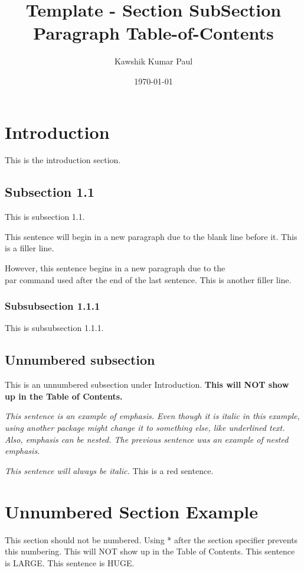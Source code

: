 \documentclass[14pt, a4paper]{article} %
\title{Template - Section SubSection Paragraph Table-of-Contents}
\author{Kawshik Kumar Paul}
\date{\today}
\begin{document}
\maketitle
\tableofcontents %
\pagebreak %

\section{Introduction}
This is the introduction section.

\subsection{Subsection 1.1}
This is subsection 1.1.

This sentence will begin in a new paragraph due to the blank line before it. This is a filler line.\par
However, this sentence begins in a new paragraph due to the \\par command used after the end of the last sentence. This is another filler line.

\subsubsection{Subsubsection 1.1.1}
This is subsubsection 1.1.1.

\subsection*{Unnumbered subsection}
This is an unnumbered subsection under Introduction. \textbf{This will NOT show up in the Table of Contents.} 

\emph{This sentence is an example of emphasis. Even though it is italic in this example, using another package might change it to something else, like underlined text.  \emph{Also, emphasis can be nested.} The previous sentence was an example of nested emphasis.} 

\textit{This sentence will always be italic.}
{\color{red} This is a red sentence.} %


\section*{Unnumbered Section Example}
This section should not be numbered. Using * after the section specifier prevents this numbering. This will NOT show up in the Table of Contents.
\LARGE{This sentence is LARGE.}
\Huge{This sentence is HUGE.}
\end{document}
